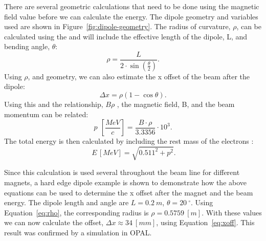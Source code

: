 There are several geometric calculations that need to be done using the magnetic field value
before we can calculate the energy. The dipole geometry and variables used are shown in Figure~\ref{fig:dipole-geometry}.
The radius of curvature, $\rho$, can be calculated using the  and 
will include the effective length of the dipole, L, and bending angle, $\theta$:
\begin{equation}
	\rho = \frac{L}{2\cdot \sin(\frac{\theta}{2})}.
\end{equation}\label{eq:rho}
Using $\rho$, and geometry, we can also estimate the x offset of the
beam after the dipole: 
\begin{equation}
	\Delta x = \rho \left( 1- \cos\theta \right).
\end{equation}\label{eq:xoff}
Using this and the relationship, $B\rho$ \cite{Wiedemann},
the magnetic field, B, and the beam momentum can be related: %
\begin{equation}
	p\SI{}{\,\left[\frac{MeV}{c}\right]} = \frac{B\cdot \rho}{3.3356}\cdot 10^3.
	\label{eq:pdipole}
\end{equation}
  The total energy is then calculated by including the rest mass of the electrons \cite{Griffiths}:
\begin{equation}
	\SI{}{E\,[MeV]} = \sqrt{0.511^2+p^2}.
	\label{eq:energy}
\end{equation}

Since this calculation is used several  throughout the 
beam line for different magnets, a hard edge dipole example is shown 
to demonstrate how the above equations can be used to determine
the x offset after the magnet and the beam energy. 
The dipole length and  angle are  $L=\SI{0.2}{m}$,  $\theta=\SI{20}{^\circ}$. 
Using Equation~\ref{eq:rho}, 
the corresponding radius is $\rho = \SI{0.5759}{[m]}$. 
With these values we can now calculate the offset, $\Delta x \approx \SI{34}{[mm]}$, 
using Equation~\ref{eq:xoff}. This result was confirmed by a simulation in OPAL.   

